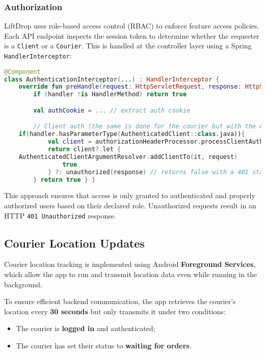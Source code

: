 \subsubsection{Authorization}

LiftDrop uses role-based access control (RBAC) to enforce feature access policies. Each API endpoint inspects the session token to determine whether the requester is a \texttt{Client} or a \texttt{Courier}. This is handled at the controller layer using a Spring \texttt{HandlerInterceptor}:

\begin{lstlisting}[language=Kotlin, caption={Condensed Kotlin-style pseudocode for AuthenticationInterceptor}]
@Component
class AuthenticationInterceptor(...) : HandlerInterceptor {
    override fun preHandle(request: HttpServletRequest, response: HttpServletResponse, handler: Any): Boolean {
        if (handler !is HandlerMethod) return true

        val authCookie = ... // extract auth cookie

        // Client auth (the same is done for the courier but with the AuthenticatedCourier class)
    if(handler.hasParameterType(AuthenticatedClient::class.java)){
            val client = authorizationHeaderProcessor.processClientAuthorizationHeaderValue(authCookie?.value)
            return client?.let {
    AuthenticatedClientArgumentResolver.addClientTo(it, request)
                true
            } ?: unauthorized(response) // returns false with a 401 status code
        } return true } }
\end{lstlisting}


This approach ensures that access is only granted to authenticated and properly authorized users based on their declared role. Unauthorized requests result in an HTTP \texttt{401 Unauthorized} response.

\subsection{Courier Location Updates}

Courier location tracking is implemented using Android \textbf{Foreground Services}, which allow the app to run and transmit location data even while running in the background.

To ensure efficient backend communication, the app retrieves the courier’s location every \textbf{30 seconds} but only transmits it under two conditions:
\begin{itemize}
    \item The courier is \textbf{logged in} and authenticated;
    \item The courier has set their status to \textbf{waiting for orders}.
\end{itemize}


